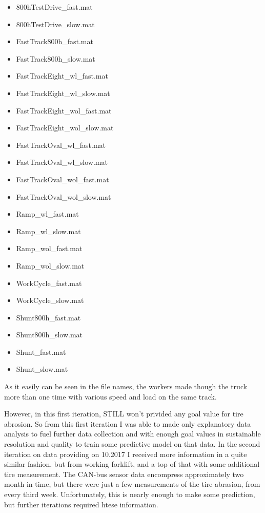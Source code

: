 \begin{itemize}[noitemsep]
    \item {800hTestDrive\_fast.mat}
    \item {800hTestDrive\_slow.mat}
    \item {FastTrack800h\_fast.mat}
 	\item {FastTrack800h\_slow.mat}
	\item {FastTrackEight\_wl\_fast.mat}
	\item {FastTrackEight\_wl\_slow.mat}
	\item {FastTrackEight\_wol\_fast.mat}
	\item {FastTrackEight\_wol\_slow.mat}
  	\item {FastTrackOval\_wl\_fast.mat}
	\item {FastTrackOval\_wl\_slow.mat}
	\item {FastTrackOval\_wol\_fast.mat}
	\item {FastTrackOval\_wol\_slow.mat}
	\item {Ramp\_wl\_fast.mat} 
	\item {Ramp\_wl\_slow.mat}
	\item {Ramp\_wol\_fast.mat}
	\item {Ramp\_wol\_slow.mat}
    \item {WorkCycle\_fast.mat}
    \item {WorkCycle\_slow.mat}
	\item {Shunt800h\_fast.mat}  	
  	\item {Shunt800h\_slow.mat}	
 	\item {Shunt\_fast.mat} 	
 	\item {Shunt\_slow.mat}
\end{itemize}

				\noindent
As it easily can be seen in the file names, the workers made though the truck more than one time with various speed and load on the same track.

However, in this first iteration, STILL won't privided any goal value for tire abrosion. So from this first iteration I was able to made only explanatory data analysis to fuel further data collection and with enough goal values in sustainable resolution and quality to train some predictive model on that data.
				\noindent
In the second iteration on data providing on 10.2017 I received more information in a quite similar fashion, but from working forklift, and a top of that with some additional tire measurement. The CAN-bus sensor data encompress approximately two month in time, but there were just a few measurements of the tire abrasion, from every third week. Unfortunately, this is nearly enough to make some prediction, but further iterations required htese information.

